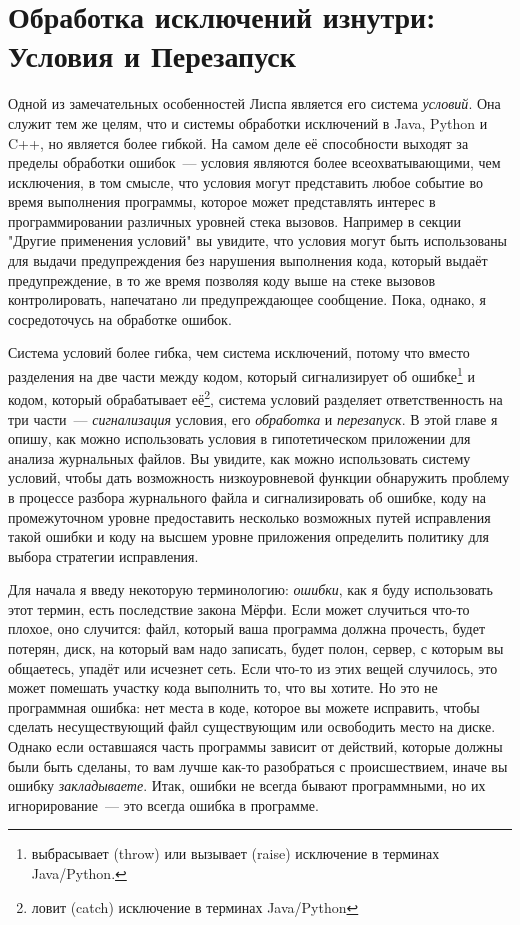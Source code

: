 \chapter{Обработка исключений изнутри: Условия и Перезапуск}
\label{ch:19}

Одной из замечательных особенностей Лиспа является его система \textit{условий}. Она
служит тем же целям, что и системы обработки исключений в Java, Python и C++, но является
более гибкой. На самом деле её способности выходят за пределы обработки ошибок~--- условия
являются более всеохватывающими, чем исключения, в том смысле, что условия могут
представить любое событие во время выполнения программы, которое может представлять
интерес в программировании различных уровней стека вызовов. Например в секции "Другие
применения условий" вы увидите, что условия могут быть использованы для выдачи
предупреждения без нарушения выполнения кода, который выдаёт предупреждение, в то же время
позволяя коду выше на стеке вызовов контролировать, напечатано ли предупреждающее
сообщение. Пока, однако, я сосредоточусь на обработке ошибок.

Система условий более гибка, чем система исключений, потому что вместо разделения на две
части между кодом, который сигнализирует об ошибке\footnote{выбрасывает (throw) или
  вызывает (raise) исключение в терминах Java/Python.} и кодом, который обрабатывает
её\footnote{ловит (catch) исключение в терминах Java/Python}, система условий разделяет
ответственность на три части~--- \textit{сигнализация} условия, его \textit{обработка} и
\textit{перезапуск}. В этой главе я опишу, как можно использовать условия в гипотетическом
приложении для анализа журнальных файлов. Вы увидите, как можно использовать систему
условий, чтобы дать возможность низкоуровневой функции обнаружить проблему в процессе
разбора журнального файла и сигнализировать об ошибке, коду на промежуточном уровне
предоставить несколько возможных путей исправления такой ошибки и коду на высшем уровне
приложения определить политику для выбора стратегии исправления.

Для начала я введу некоторую терминологию: \textit{ошибки}, как я буду использовать этот
термин, есть последствие закона Мёрфи. Если может случиться что-то плохое, оно случится:
файл, который ваша программа должна прочесть, будет потерян, диск, на который вам надо
записать, будет полон, сервер, с которым вы общаетесь, упадёт или исчезнет сеть. Если
что-то из этих вещей случилось, это может помешать участку кода выполнить то, что вы
хотите. Но это не программная ошибка: нет места в коде, которое вы можете исправить, чтобы
сделать несуществующий файл существующим или освободить место на диске. Однако если
оставшаяся часть программы зависит от действий, которые должны были быть сделаны, то вам
лучше как-то разобраться с происшествием, иначе вы ошибку \textit{закладываете}. Итак,
ошибки не всегда бывают программными, но их игнорирование~--- это всегда ошибка в
программе.

